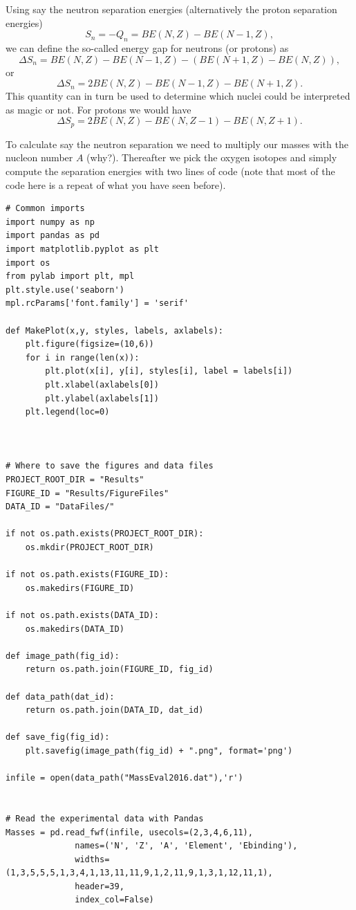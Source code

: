 \documentclass[%
oneside,                 %
final,                   %
10pt]{article}
\begin{document}
Using say the neutron separation energies (alternatively the proton separation energies)
\[
S_n= -Q_n= BE(N,Z)-BE(N-1,Z),
\]
we can define the so-called energy gap for neutrons (or protons) as 
\[
\Delta S_n= BE(N,Z)-BE(N-1,Z)-\left(BE(N+1,Z)-BE(N,Z)\right),
\]
or 
\[
\Delta S_n= 2BE(N,Z)-BE(N-1,Z)-BE(N+1,Z).
\]
This quantity can in turn be used to determine which nuclei could be interpreted as  magic or not. 
For protons we would have 
\[
\Delta S_p= 2BE(N,Z)-BE(N,Z-1)-BE(N,Z+1).
\]

To calculate say the neutron separation we need to multiply our masses with the nucleon number $A$ (why?).
Thereafter we pick the oxygen isotopes and simply compute the separation energies with  two lines of code (note that most of the code here is a repeat of what you have seen before). 
\begin{verbatim}
# Common imports
import numpy as np
import pandas as pd
import matplotlib.pyplot as plt
import os
from pylab import plt, mpl
plt.style.use('seaborn')
mpl.rcParams['font.family'] = 'serif'

def MakePlot(x,y, styles, labels, axlabels):
    plt.figure(figsize=(10,6))
    for i in range(len(x)):
        plt.plot(x[i], y[i], styles[i], label = labels[i])
        plt.xlabel(axlabels[0])
        plt.ylabel(axlabels[1])
    plt.legend(loc=0)



# Where to save the figures and data files
PROJECT_ROOT_DIR = "Results"
FIGURE_ID = "Results/FigureFiles"
DATA_ID = "DataFiles/"

if not os.path.exists(PROJECT_ROOT_DIR):
    os.mkdir(PROJECT_ROOT_DIR)

if not os.path.exists(FIGURE_ID):
    os.makedirs(FIGURE_ID)

if not os.path.exists(DATA_ID):
    os.makedirs(DATA_ID)

def image_path(fig_id):
    return os.path.join(FIGURE_ID, fig_id)

def data_path(dat_id):
    return os.path.join(DATA_ID, dat_id)

def save_fig(fig_id):
    plt.savefig(image_path(fig_id) + ".png", format='png')

infile = open(data_path("MassEval2016.dat"),'r')


# Read the experimental data with Pandas
Masses = pd.read_fwf(infile, usecols=(2,3,4,6,11),
              names=('N', 'Z', 'A', 'Element', 'Ebinding'),
              widths=(1,3,5,5,5,1,3,4,1,13,11,11,9,1,2,11,9,1,3,1,12,11,1),
              header=39,
              index_col=False)


\end{verbatim}
\end{document}
